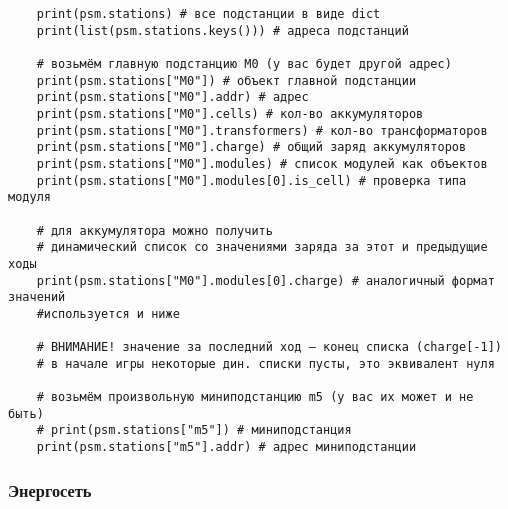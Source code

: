 \begin{verbatim}
    print(psm.stations) # все подстанции в виде dict 
    print(list(psm.stations.keys())) # адреса подстанций 

    # возьмём главную подстанцию М0 (у вас будет другой адрес) 
    print(psm.stations["M0"]) # объект главной подстанции 
    print(psm.stations["M0"].addr) # адрес 
    print(psm.stations["M0"].cells) # кол-во аккумуляторов 
    print(psm.stations["M0"].transformers) # кол-во трансформаторов 
    print(psm.stations["M0"].charge) # общий заряд аккумуляторов 
    print(psm.stations["M0"].modules) # список модулей как объектов 
    print(psm.stations["M0"].modules[0].is_cell) # проверка типа модуля 

    # для аккумулятора можно получить 
    # динамический список со значениями заряда за этот и предыдущие ходы 
    print(psm.stations["M0"].modules[0].charge) # аналогичный формат значений 
    #используется и ниже 

    # ВНИМАНИЕ! значение за последний ход — конец списка (charge[-1]) 
    # в начале игры некоторые дин. списки пусты, это эквивалент нуля 

    # возьмём произвольную миниподстанцию m5 (у вас их может и не быть) 
    # print(psm.stations["m5"]) # миниподстанция 
    print(psm.stations["m5"].addr) # адрес миниподстанции 
\end{verbatim}

\subsubsection*{Энергосеть}


